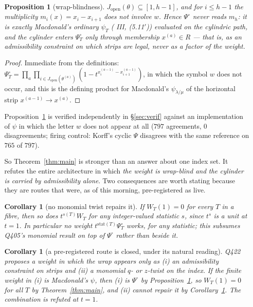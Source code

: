 \documentclass[11pt]{article}
\theoremstyle{plain}
\newtheorem{proposition}[theorem]{Proposition}
\newtheorem{corollary}[theorem]{Corollary}
\theoremstyle{definition}
\newcommand{\Jop}{J_{\mathrm{open}}}
\newcommand{\Psiop}{\Psi^{\circ}}
\begin{document}
\begin{proposition}[wrap-blindness]\label{prop:blind}
$\Jop(\theta)\subseteq[1,h-1]$, and for $i\le h-1$ the multiplicity $m_i(x)=x_i-x_{i+1}$ does not
involve $w$. Hence $\Psiop$ never reads $m_h$: it is exactly Macdonald's ordinary
$\psi_T$ (\cite{Macdonald} III, (5.11$'$)) evaluated on the cylindric path, and the cylinder
enters $\Psiop_T$ \emph{only} through membership $x^{(a)}\in R$ --- that is, as an
\emph{admissibility constraint on which strips are legal}, never as a factor of the weight.
\end{proposition}

\begin{proof}
Immediate from the definitions: $\Psiop_T=\prod_a\prod_{i\in\Jop(\theta^{(a)})}(1-t^{x^{(a-1)}_i-x^{(a-1)}_{i+1}})$,
in which the symbol $w$ does not occur, and this is the defining product for Macdonald's
$\psi_{\lambda/\mu}$ of the horizontal strip $x^{(a-1)}\to x^{(a)}$.
\end{proof}

Proposition~\ref{prop:blind} is verified independently in \S\ref{sec:verif} against an
implementation of $\psi$ in which the letter $w$ does not appear at all
($797$ agreements, $0$ disagreements; firing control: Korff's cyclic $\Psi$ disagrees with the
same reference on $765$ of $797$).

So Theorem~\ref{thm:main} is stronger than an answer about one index set. It refutes the entire
architecture in which \emph{the weight is wrap-blind and the cylinder is carried by
admissibility alone}. Two consequences are worth stating because they are routes that were, as
of this morning, pre-registered as live.

\begin{corollary}[no monomial twist repairs it]\label{cor:monomial}
If $W_T(1)=0$ for every $T$ in a fibre, then so does $t^{s(T)}W_T$ for any integer-valued
statistic $s$, since $t^{s}$ is a unit at $t=1$. In particular no weight $t^{\mathrm{stat}(T)}\Psiop_T$
works, for any statistic; this subsumes Q405's monomial result on top of $\Psiop$ rather than
beside it.
\end{corollary}

\begin{corollary}[a pre-registered route is closed, under its natural reading]\label{cor:q422}
Q422 proposes a weight in which the wrap appears only as (i) an admissibility constraint on
strips and (ii) a monomial $q$- or $z$-twist on the index. If the finite weight in (i) is
Macdonald's $\psi$, then (i) is $\Psiop$ by Proposition~\ref{prop:blind}, so $W_T(1)=0$ for all
$T$ by Theorem~\ref{thm:main}, and (ii) cannot repair it by
Corollary~\ref{cor:monomial}. The combination is refuted at $t=1$.
\end{corollary}
\end{document}
